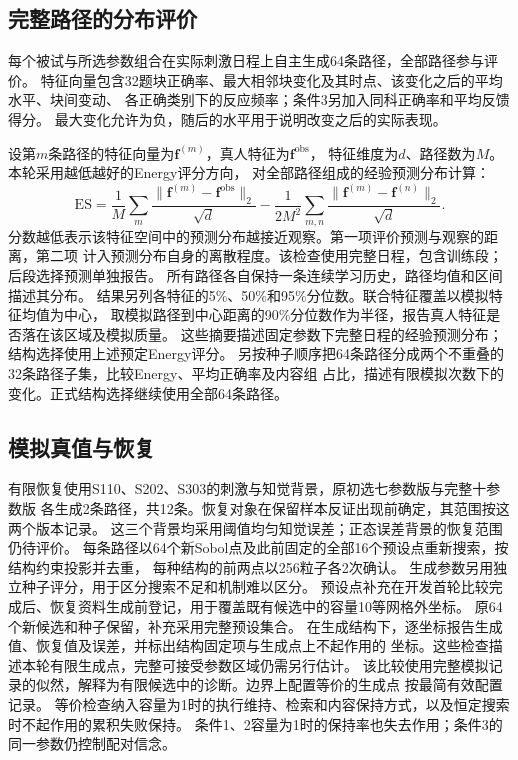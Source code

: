 \documentclass[11pt,a4paper]{article}
\numberwithin{equation}{section}
\begin{document}
\subsection{完整路径的分布评价}
每个被试与所选参数组合在实际刺激日程上自主生成64条路径，全部路径参与评价。
特征向量包含32题块正确率、最大相邻块变化及其时点、该变化之后的平均水平、块间变动、
各正确类别下的反应频率；条件3另加入同科正确率和平均反馈得分。
最大变化允许为负，随后的水平用于说明改变之后的实际表现。

设第$m$条路径的特征向量为$\bm f^{(m)}$，真人特征为$\bm f^{\mathrm{obs}}$，
特征维度为$d$、路径数为$M$。本轮采用越低越好的Energy评分方向\cite{gneiting2007}，
对全部路径组成的经验预测分布计算：
\begin{equation}
\mathrm{ES}=\frac1M\sum_m\frac{\|\bm f^{(m)}-\bm f^{\mathrm{obs}}\|_2}{\sqrt d}
-\frac1{2M^2}\sum_{m,n}\frac{\|\bm f^{(m)}-\bm f^{(n)}\|_2}{\sqrt d}.
\label{eq:energy}
\end{equation}
分数越低表示该特征空间中的预测分布越接近观察。第一项评价预测与观察的距离，第二项
计入预测分布自身的离散程度。该检查使用完整日程，包含训练段；后段选择预测单独报告。
所有路径各自保持一条连续学习历史，路径均值和区间描述其分布。
结果另列各特征的5\%、50\%和95\%分位数。联合特征覆盖以模拟特征均值为中心，
取模拟路径到中心距离的90\%分位数作为半径，报告真人特征是否落在该区域及模拟质量。
这些摘要描述固定参数下完整日程的经验预测分布；结构选择使用上述预定Energy评分。
另按种子顺序把64条路径分成两个不重叠的32条路径子集，比较Energy、平均正确率及内容组
占比，描述有限模拟次数下的变化。正式结构选择继续使用全部64条路径。

\subsection{模拟真值与恢复}
有限恢复使用S110、S202、S303的刺激与知觉背景，原初选七参数版与完整十参数版
各生成2条路径，共12条。恢复对象在保留样本反证出现前确定，其范围按这两个版本记录。
这三个背景均采用阈值均匀知觉误差；正态误差背景的恢复范围仍待评价。
每条路径以64个新Sobol点及此前固定的全部16个预设点重新搜索，按结构约束投影并去重，
每种结构的前两点以256粒子各2次确认。
生成参数另用独立种子评分，用于区分搜索不足和机制难以区分。
预设点补充在开发首轮比较完成后、恢复资料生成前登记，用于覆盖既有候选中的容量10等网格外坐标。
原64个新候选和种子保留，补充采用完整预设集合。
在生成结构下，逐坐标报告生成值、恢复值及误差，并标出结构固定项与生成点上不起作用的
坐标。这些检查描述本轮有限生成点，完整可接受参数区域仍需另行估计。
该比较使用完整模拟记录的似然，解释为有限候选中的诊断。边界上配置等价的生成点
按最简有效配置记录。
等价检查纳入容量为1时的执行维持、检索和内容保持方式，以及恒定搜索时不起作用的累积失败保持。
条件1、2容量为1时的保持率也失去作用；条件3的同一参数仍控制配对信念。
\end{document}
